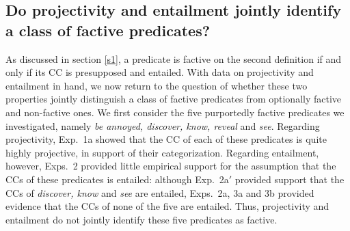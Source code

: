 \documentclass[11pt,fleqn]{article}
\newcommand{\6}{\mbox{$[\hspace*{-.6mm}[$}}
\newcommand{\9}{\mbox{$]\hspace*{-.6mm}]$}}
\begin{document}
{\subsection{Do projectivity and entailment jointly identify a class of factive predicates?}\label{s34}

As discussed in section \ref{s1}, a predicate is factive on the second definition if and only if its CC is presupposed and entailed. With data on projectivity and entailment in hand, we now return to the question of whether these two properties jointly distinguish a class of factive predicates from optionally factive and non-factive ones. We first consider the five purportedly factive predicates we investigated, namely {\em be annoyed, discover, know, reveal} and {\em see}. Regarding projectivity, Exp.~1a showed that the CC of each of these predicates is quite highly projective, in support of their categorization. Regarding entailment, however, Exps.~2 provided little empirical support for the assumption that the CCs of these predicates is entailed: although Exp.~2a$'$ provided support that the CCs of {\em discover, know} and {\em see} are entailed, Exps.~2a, 3a and 3b provided evidence that the CCs of none of the five are entailed. Thus, projectivity and entailment do not jointly identify these five predicates as factive.

}
\end{document}
